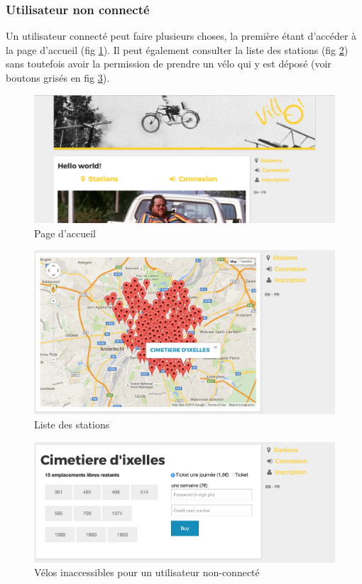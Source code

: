 \documentclass[a4paper]{article}
\begin{document}
    \subsubsection{Utilisateur non connecté}
    Un utilisateur connecté peut faire plusieurs choses, la première étant d'accéder à la page d'accueil (fig \ref{fig-s1}). Il peut également consulter la liste des stations (fig \ref{fig-s2}) sans toutefois avoir la permission de prendre un vélo qui y est déposé (voir boutons grisés en fig \ref{fig-s3}).
    \begin{figure}
    \includegraphics[width=\textwidth]{images/s1.png}
    \caption{Page d'accueil}
    \label{fig-s1}
    \end{figure}
    
    \begin{figure}
    \includegraphics[width=\textwidth]{images/s2.png}
    \caption{Liste des stations}
    \label{fig-s2}
    \end{figure}
    
    \begin{figure}
    \includegraphics[width=\textwidth]{images/s3.png}
    \caption{Vélos inaccessibles pour un utilisateur non-connecté}
    \label{fig-s3}
    \end{figure}
    
\end{document}
